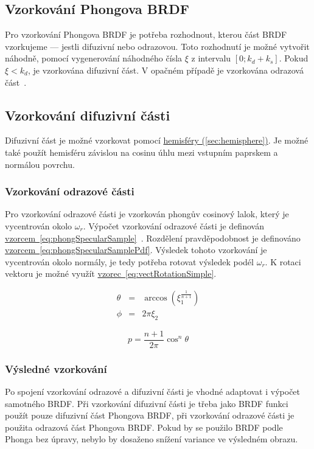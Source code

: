 \documentclass[czech,master]{diploma}
\newcommand{\interval}[1]{\left[{#1}\right]}
\newcommand{\refl}{\omega_{r}}
\newcommand{\randU}{\xi_{1}}
\newcommand{\randV}{\xi_{2}}
\begin{document}
\subsection{Vzorkování Phongova BRDF} \label{sec:phongSampling}
Pro vzorkování Phongova BRDF je potřeba rozhodnout, kterou část BRDF vzorkujeme --- jestli difuzivní nebo odrazovou. Toto rozhodnutí je možné vytvořit náhodně, pomocí vygenerování náhodného čísla \(\xi\) z intervalu \(\interval{0;k_d+k_s}\). Pokud \(\xi < k_d\), je vzorkována difuzivní část. V opačném případě je vzorkována odrazová část~\cite{KrivanekBRDFIBL}.
\subsection{Vzorkování difuzivní části}
Difuzivní část je možné vzorkovat pomocí \hyperref[sec:hemisphere]{hemisféry (\ref{sec:hemisphere})}. Je možné také použít hemisféru závislou na cosinu úhlu mezi vstupním paprskem a normálou povrchu.

\subsubsection{Vzorkování odrazové části}
Pro vzorkování odrazové části je vzorkován phongův cosinový lalok, který je vycentrován okolo \(\refl\). Výpočet vzorkování odrazové části je definován \hyperref[eq:phongSpecularSample]{vzorcem~\ref{eq:phongSpecularSample}}~\cite{KrivanekBRDFIBL}. Rozdělení pravděpodobnost je definováno \hyperref[eq:phongSpecularSamplePdf]{vzorcem~\ref{eq:phongSpecularSamplePdf}}.
Výsledek tohoto vzorkování je vycentrován okolo normály, je tedy potřeba rotovat výsledek podél \(\refl\). K rotaci vektoru je možné využít \hyperref[eq:vectRotationSimple]{vzorec~\ref{eq:vectRotationSimple}}.

\begin{eqnarray}
  \theta & = & \arccos(\randU^{\frac{1}{n+1}}) \nonumber \\
  \phi & = & 2\pi\randV\label{eq:phongSpecularSample}
\end{eqnarray}

\begin{equation} \label{eq:phongSpecularSamplePdf}
  p = \frac{n+1}{2\pi}\cos^n\theta
\end{equation}

\subsubsection{Výsledné vzorkování}
Po spojení vzorkování odrazové a difuzivní části je vhodné adaptovat i výpočet samotného BRDF\@. Při vzorkování difuzivní části je třeba jako BRDF funkci použít pouze difuzivní část Phongova BRDF, při vzorkování odrazové části je použita odrazová část Phongova BRDF\@. Pokud by se použilo BRDF podle Phonga bez úpravy, nebylo by dosaženo snížení variance ve výsledném obrazu.~\cite{KrivanekBRDFIBL}
\end{document}
